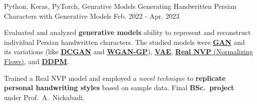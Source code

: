 \begin{cventries}
  \cventry
    {Python, Keras, PyTorch, Genrative Models} %
    {Generating Handwritten Persian Characters with Generative Models} %
    {} %
    {Feb. 2022 - Apr. 2023} %
    {
      \begin{cvitems} %
      	\item {Evaluated and analyzed  \textbf{generative models} ability to represent and reconstruct individual Persian handwritten characters. The studied models were \href{https://arxiv.org/abs/1406.2661}{\textbf{GAN}} and its variations (like \href{https://arxiv.org/abs/1511.06434}{\textbf{DCGAN}} and \href{https://arxiv.org/abs/1704.00028}{\textbf{WGAN-GP}}), \href{https://arxiv.org/abs/1312.6114}{\textbf{VAE}}, \href{https://arxiv.org/abs/1605.08803}{\textbf{Real NVP} (Normalizing Flows)}, and \href{https://arxiv.org/abs/2006.11239}{\textbf{DDPM}}.}
      	\item{Trained a Real NVP model and employed a \textit{novel technique} to \textbf{replicate personal handwriting styles} based on sample data. Final \textbf{BSc.~project} under Prof.~A.~Nickabadi.}
      \end{cvitems}
    }




\end{cventries}

